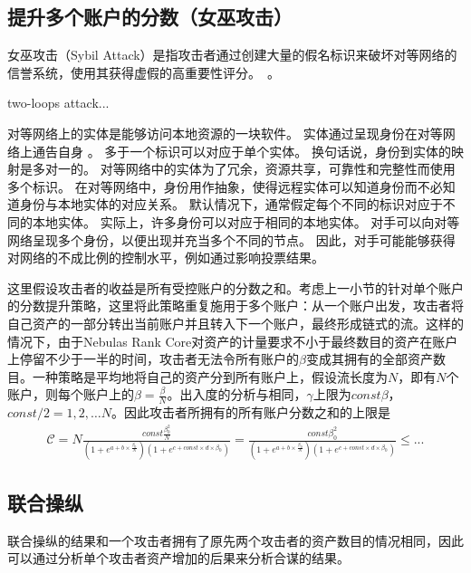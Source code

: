 \subsection{提升多个账户的分数（女巫攻击）}
女巫攻击（Sybil Attack）是指攻击者通过创建大量的假名标识来破坏对等网络的信誉系统，使用其获得虚假的高重要性评分。~\cite{quercia2010sybil}。

two-loops attack...


对等网络上的实体是能够访问本地资源的一块软件。 实体通过呈现身份在对等网络上通告自身 。 多于一个标识可以对应于单个实体。
换句话说，身份到实体的映射是多对一的。 对等网络中的实体为了冗余，资源共享，可靠性和完整性而使用多个标识。
在对等网络中，身份用作抽象，使得远程实体可以知道身份而不必知道身份与本地实体的对应关系。
默认情况下，通常假定每个不同的标识对应于不同的本地实体。 实际上，许多身份可以对应于相同的本地实体。
对手可以向对等网络呈现多个身份，以便出现并充当多个不同的节点。 因此，对手可能能够获得对网络的不成比例的控制水平，例如通过影响投票结果。


这里假设攻击者的收益是所有受控账户的分数之和。考虑上一小节的针对单个账户的分数提升策略，这里将此策略重复施用于多个账户：从一个账户出发，攻击者将自己资产的一部分转出当前账户并且转入下一个账户，最终形成链式的流。这样的情况下，由于Nebulas Rank Core对资产的计量要求不小于最终数目的资产在账户上停留不少于一半的时间，攻击者无法令所有账户的$\beta$变成其拥有的全部资产数目。一种策略是平均地将自己的资产分到所有账户上，假设流长度为$N$，即有$N$个账户，则每个账户上的$\beta = \frac{\beta}{N}$。出入度的分析与相同，$\gamma$上限为$const \beta$，$const/2 = 1, 2, \dots N$。因此攻击者所拥有的所有账户分数之和的上限是
\begin{align}
\mathcal{C} = N \frac{const \frac{\beta_0 ^2}{N}}{ (1+e^{a + b \times{} \frac{\beta_0}{N} }) (1+e^{c + const \times d \times{} \beta_0})} = \frac{const \beta_0 ^2 }{ (1+e^{a + b \times{} \frac{\beta_0}{N} }) (1+e^{c + const \times d \times{} \beta_0})} \leq ...
\end{align}


\subsection{联合操纵 \label{sec:coalition}}
联合操纵的结果和一个攻击者拥有了原先两个攻击者的资产数目的情况相同，因此可以通过分析单个攻击者资产增加的后果来分析合谋的结果。

